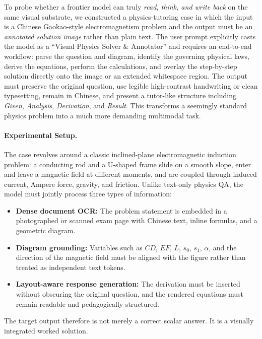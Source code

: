 \documentclass{llmxive}
\begin{document}
To probe whether a frontier model can truly \emph{read, think, and write back} on the same visual substrate, we constructed a physics-tutoring case in which the input is a Chinese Gaokao-style electromagnetism problem and the output must be an \emph{annotated solution image} rather than plain text. The user prompt explicitly casts the model as a ``Visual Physics Solver \& Annotator'' and requires an end-to-end workflow: parse the question and diagram, identify the governing physical laws, derive the equations, perform the calculations, and overlay the step-by-step solution directly onto the image or an extended whitespace region. The output must preserve the original question, use legible high-contrast handwriting or clean typesetting, remain in Chinese, and present a tutor-like structure including \emph{Given}, \emph{Analysis}, \emph{Derivation}, and \emph{Result}. This transforms a seemingly standard physics problem into a much more demanding multimodal task.

\paragraph{Experimental Setup.}
The case revolves around a classic inclined-plane electromagnetic induction problem: a conducting rod and a U-shaped frame slide on a smooth slope, enter and leave a magnetic field at different moments, and are coupled through induced current, Ampere force, gravity, and friction. Unlike text-only physics QA, the model must jointly process three types of information:
\begin{itemize}
    \item \textbf{Dense document OCR:} The problem statement is embedded in a photographed or scanned exam page with Chinese text, inline formulas, and a geometric diagram.
    \item \textbf{Diagram grounding:} Variables such as $CD$, $EF$, $L$, $s_0$, $s_1$, $\alpha$, and the direction of the magnetic field must be aligned with the figure rather than treated as independent text tokens.
    \item \textbf{Layout-aware response generation:} The derivation must be inserted without obscuring the original question, and the rendered equations must remain readable and pedagogically structured.
\end{itemize}
The target output therefore is not merely a correct scalar answer. It is a visually integrated worked solution.
\end{document}
